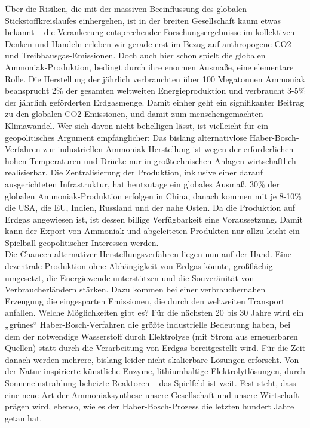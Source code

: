 \begin{multicols}{2}
Über die Risiken, die mit der massiven Beeinflussung des globalen Stickstoffkreislaufes einhergehen, ist in der breiten Gesellschaft kaum etwas bekannt – die Verankerung entsprechender Forschungsergebnisse im kollektiven Denken und Handeln erleben wir gerade erst im Bezug auf anthropogene CO2- und Treibhausgas-Emissionen. Doch auch hier schon spielt die globalen Ammoniak-Produktion, bedingt durch ihre enormen Ausmaße, eine elementare Rolle. Die Herstellung der jährlich verbrauchten über 100 Megatonnen Ammoniak beansprucht 2\% der gesamten weltweiten Energieproduktion und verbraucht 3-5\% der jährlich geförderten Erdgasmenge. Damit einher geht ein signifikanter Beitrag zu den globalen CO2-Emissionen, und damit zum menschengemachten Klimawandel. Wer sich davon nicht behelligen lässt, ist vielleicht für ein geopolitisches Argument empfänglicher: Das bislang alternativlose Haber-Bosch-Verfahren zur industriellen Ammoniak-Herstellung ist wegen der erforderlichen hohen Temperaturen und Drücke nur in großtechnischen Anlagen wirtschaftlich realisierbar. Die Zentralisierung der Produktion, inklusive einer darauf ausgerichteten Infrastruktur, hat heutzutage ein globales Ausmaß. 30\% der globalen Ammoniak-Produktion erfolgen in China, danach kommen mit je 8-10\% die USA, die EU, Indien, Russland und der nahe Osten. Da die Produktion auf Erdgas angewiesen ist, ist dessen billige Verfügbarkeit eine Voraussetzung. Damit kann der Export von Ammoniak und abgeleiteten Produkten nur allzu leicht ein Spielball geopolitischer Interessen werden.
\\
Die Chancen alternativer Herstellungsverfahren liegen nun auf der Hand. Eine dezentrale Produktion ohne Abhängigkeit von Erdgas könnte, großflächig umgesetzt, die Energiewende unterstützen und die Souveränität von Verbraucherländern stärken. Dazu kommen bei einer verbrauchernahen Erzeugung die eingesparten Emissionen, die durch den weltweiten Transport anfallen. Welche Möglichkeiten gibt es? Für die nächsten 20 bis 30 Jahre wird ein „grünes“ Haber-Bosch-Verfahren die größte industrielle Bedeutung haben, bei dem der notwendige Wasserstoff durch Elektrolyse (mit Strom aus erneuerbaren Quellen) statt durch die Verarbeitung von Erdgas bereitgestellt wird. Für die Zeit danach werden mehrere, bislang leider nicht skalierbare Lösungen erforscht. Von der Natur inspirierte künstliche Enzyme, lithiumhaltige Elektrolytlösungen, durch Sonneneinstrahlung beheizte Reaktoren – das Spielfeld ist weit. Fest steht, dass eine neue Art der Ammoniaksynthese unsere Gesellschaft und unsere Wirtschaft prägen wird, ebenso, wie es der Haber-Bosch-Prozess die letzten hundert Jahre getan hat.

\end{multicols}
